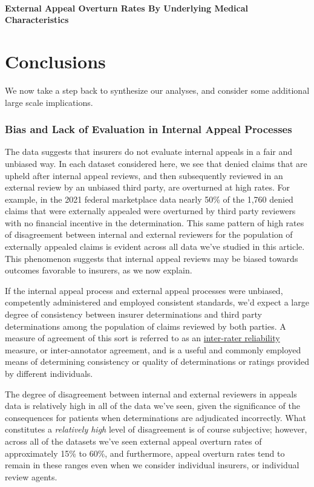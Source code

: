 \documentclass[12pt, a4paper,twoside]{report}
\theoremstyle{plain} %
\theoremstyle{definition} %
\theoremstyle{remark} %
\numberwithin{equation}{chapter}
\begin{document}
		\subsubsection{External Appeal Overturn Rates By Underlying Medical Characteristics}
		
		\chapter{Conclusions}\label{conclusions}
		
		We now take a step back to synthesize our analyses, and consider some additional large scale implications.
		
		\subsection{Bias and Lack of Evaluation in Internal Appeal Processes}
		
		The data suggests that insurers do not evaluate internal appeals in a fair and unbiased way. In each dataset considered here, we see that denied claims that are upheld after internal appeal reviews, and then subsequently reviewed in an external review by an unbiased third party, are overturned at high rates. For example, in the 2021 federal marketplace data nearly 50\% of the 1,760 denied claims that were externally appealed were overturned by third party reviewers with no financial incentive in the determination. This same pattern of high rates of disagreement between internal and external reviewers for the population of externally appealed claims is evident across all data we've studied in this article. This phenomenon suggests that internal appeal reviews may be biased towards outcomes favorable to insurers, as we now explain.
		
		If the internal appeal process and external appeal processes were unbiased, competently administered and employed consistent standards, we'd expect a large degree of consistency between insurer determinations and third party determinations among the population of claims reviewed by both parties. A measure of agreement of this sort is referred to as an \href{https://en.wikipedia.org/wiki/Inter-rater_reliability}{inter-rater reliability} measure, or inter-annotator agreement, and is a useful and commonly employed means of determining consistency or quality of determinations or ratings provided by different individuals.
		
		The degree of disagreement between internal and external reviewers in appeals data is relatively high in all of the data we've seen, given the significance of the consequences for patients when determinations are adjudicated incorrectly. What constitutes a \emph{relatively high} level of disagreement is of course subjective; however, across all of the datasets we've seen external appeal overturn rates of approximately 15\% to 60\%, and furthermore, appeal overturn rates tend to remain in these ranges even when we consider individual insurers, or individual review agents.
		
\end{document}
